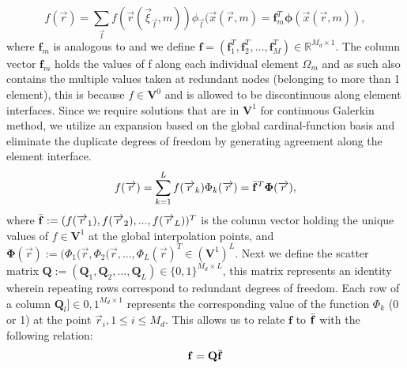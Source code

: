 \documentclass{report}
\numberwithin{equation}{section}
\begin{document}
\begin{equation}
    f(\overrightarrow{r})=\sum_{\overrightarrow{l}}f(\overrightarrow{r}(\overrightarrow{\xi}_{\overrightarrow{l}},m))\phi_{\overrightarrow{l}}(\overrightarrow{x}(\overrightarrow{r},m) = \mathbf{f}_m^T\boldsymbol{\phi}(\overrightarrow{x}(\overrightarrow{r},m)),
\end{equation}
where $\mathbf{f}_m$ is analogous to  and we define $\mathbf{f} = (\mathbf{f}_1^T,\mathbf{f}_2^T,...,\mathbf{f}_M^T ) \in \mathbb{R}^{M_d\times1}$. The column vector $\mathbf{f}_m$ holds the values of f along each individual element $\Omega_m$ and as such also contains the multiple values taken at redundant nodes (belonging to more than 1 element), this is because $f \in \mathbf{V}^0$ and is allowed to be discontinuous along element interfaces. Since we require solutions that are in $\mathbf{V}^1$ for continuous Galerkin method, we utilize an expansion based on the global cardinal-function basis and eliminate the duplicate degrees of freedom by generating agreement along the element interface.
\begin{equation}
    f(\overrightarrow{r}) = \sum_{k=1}^L f(\overrightarrow{r}_k)\Phi_k(\overrightarrow{r})=\Bar{\mathbf{f}}^T\boldsymbol{\Phi}(\overrightarrow{r}),
\end{equation}
where $\Bar{\mathbf{f}}:=(f(\overrightarrow{r}_1),f(\overrightarrow{r}_2),...,f(\overrightarrow{r}_L))^T$ is the column vector holding the unique values of $f \in \mathbf{V}^1$ at the global interpolation points, and $\boldsymbol{\Phi}(\overrightarrow{r}):= (\Phi_1(\overrightarrow{r}, \Phi_2(\overrightarrow{r},..., \Phi_L(\overrightarrow{r})^T \in (\mathbf{V}^1)^L$. Next we define the scatter matrix $\mathbf{Q}:=(\mathbf{Q}_1,\mathbf{Q}_2,...,\mathbf{Q}_L)\in \{0,1\}^{M_d\times L}$, this matrix represents an identity wherein repeating rows correspond to redundant degrees of freedom. Each row of a column $\mathbf{Q}_l ] \in {0,1}^{M_d \times 1}$ represents the corresponding value of the function $\Phi_k$ (0 or 1) at the point $\overrightarrow{r}_{i},  1\leq i \leq M_d$. This allows us to relate $\mathbf{f}$ to $\Bar{\mathbf{f}}$ with the following relation:
\begin{equation}
    \mathbf{f} = \mathbf{Q} \Bar{\mathbf{f}}
\end{equation}
\end{document}
